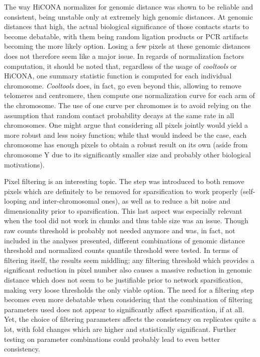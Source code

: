 The way HiCONA normalizes for genomic distance was shown to be reliable and consistent, being unstable only at extremely high genomic distances. At genomic distances that high, the actual biological significance of those contacts starts to become debatable, with them being random ligation products or PCR artifacts becoming the more likely option. Losing a few pixels at these genomic distances does not therefore seem like a major issue. In regards of normalization factors computation, it should be noted that, regardless of the usage of \textit{cooltools} or HiCONA, one summary statistic function is computed for each individual chromosome. \textit{Cooltools} does, in fact, go even beyond this, allowing to remove telomeres and centromere, then compute one normalization curve for each arm of the chromosome. The use of one curve per chromomes is to avoid relying on the assumption that random contact probability decays at the same rate in all chromosomes. One might argue that considering all pixels jointly would yield a more robust and less noisy function; while that would indeed be the case, each chromosome has enough pixels to obtain a robust result on its own (aside from chromosome Y due to its significantly smaller size and probably other biological motivations).

Pixel filtering is an interesting topic. The step was introduced to both remove pixels which are definitely to be removed for sparsification to work properly (self-looping and inter-chromosomal ones), as well as to reduce a bit noise and dimensionality prior to sparsification. This last aspect was especially relevant when the tool did not work in chunks and thus table size was an issue. Though raw counts threshold is probably not needed anymore and was, in fact, not included in the analyses presented, different combinations of genomic distance threshold and normalized counts quantile threshold were tested. In terms of filtering itself, the results seem middling; any filtering threshold which provides a significant reduction in pixel number also causes a massive reduction in genomic distance which does not seem to be justifiable prior to network sparsification, making very loose thresholds the only viable option. The need for a filtering step becomes even more debatable when considering that the combination of filtering parameters used does not appear to significantly affect sparsification, if at all. Yet, the choice of filtering parameters affects the consistency on replicates quite a lot, with fold changes which are higher and statistically significant. Further testing on parameter combinations could probably lead to even better consistency.

